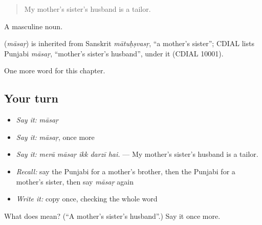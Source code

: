 \begin{quote}
My mother's sister's husband is a tailor.
\end{quote}

A masculine noun.

\begin{cousinweb}
\textbf{} (\emph{māsaṛ}) is inherited from Sanskrit \emph{mātuḥṣvasṛ}, \textquotedblleft{}a mother's sister\textquotedblright{}; CDIAL lists Punjabi \emph{māsaṛ}, \textquotedblleft{}mother's sister's husband\textquotedblright{}, under it (CDIAL 10001).
\end{cousinweb}

\begin{grammarlens}[title={What you've built}]
One more word for this chapter.
\end{grammarlens}

\subsection*{Your turn}
\begin{itemize}
\raggedright
  \item \emph{Say it:} \emph{māsaṛ}
  \item \emph{Say it:} \emph{māsaṛ}, once more
  \item \emph{Say it:} \emph{merā māsaṛ ikk darzī hai.} — My mother's sister's husband is a tailor.
  \item \emph{Recall:} say the Punjabi for a mother's brother, then the Punjabi for a mother's sister, then say \emph{māsaṛ} again
  \item \emph{Write it:} copy \textbf{} once, checking the whole word
\end{itemize}

\begin{tcolorbox}[breakable,colback=teal!4,colframe=teal!35!black,title={Before you move on}]
What does  mean? (\textquotedblleft{}A mother's sister's husband\textquotedblright{}.) Say it once more.
\end{tcolorbox}
